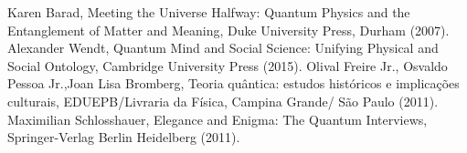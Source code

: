 \documentclass[12pt,onecolumn,preprintnumbers,amsmath,amssymbn,reprint,nofootinbib,superscriptaddress]{revtex4}    %
\begin{document}
\begin{thebibliography}{}
%
%

Karen Barad, Meeting the Universe Halfway:  Quantum Physics and the Entanglement of Matter and Meaning, Duke University Press, Durham (2007).
 Alexander Wendt, Quantum Mind and Social Science: Unifying Physical and Social Ontology, Cambridge University Press (2015).
Olival Freire Jr., Osvaldo Pessoa Jr.,Joan Lisa Bromberg, Teoria quântica:
estudos históricos e implicações culturais, EDUEPB/Livraria da F\'isica, Campina Grande/ São Paulo (2011).
Maximilian Schlosshauer, Elegance and Enigma: The Quantum Interviews, Springer-Verlag Berlin Heidelberg (2011).
 

\end{thebibliography}
\end{document}
